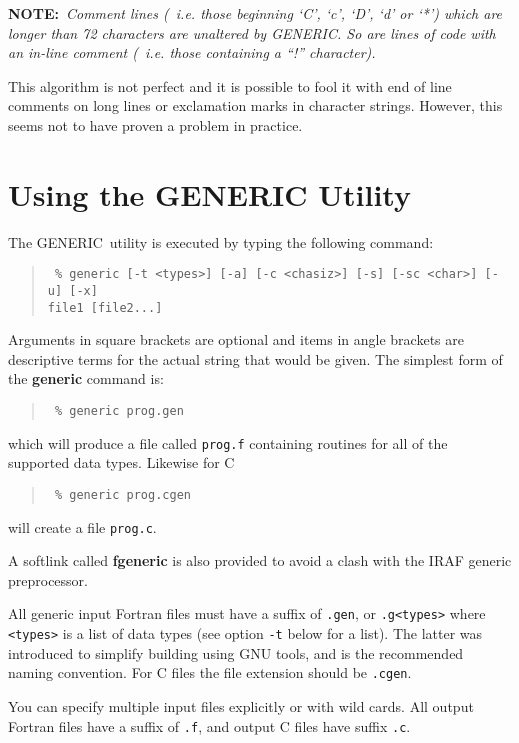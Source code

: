 \documentclass[twoside,11pt]{article}
\renewcommand{\_}{{\tt\char'137}}     %
\newcommand{\GENERIC}{{\footnotesize GENERIC}\normalsize}
\begin{document}
{\bf NOTE:}~{\it Comment lines (~{\rm i.e.} those beginning `C', `c', `D', `d' 
or `*') which are longer than 72 characters are unaltered by \GENERIC.
So are lines of code with an in-line comment (~\emph{i.e.} those containing
a ``!'' character).}

This algorithm is not perfect and it is possible to fool it with end
of line comments on long lines or exclamation marks in character
strings.  However, this seems not to have proven a problem in practice.

\section{Using the GENERIC Utility}

The \GENERIC\ utility is executed by typing the following command:

\begin{quote}{\tt
\% generic [-t <types>] [-a] [-c <chasiz>] [-s] [-sc <char>] [-u] [-x] \\
           file1 [file2...]}
\end{quote}

Arguments in square brackets are optional and items in angle brackets are
descriptive terms for the actual string that would be given.  The simplest form
of the {\bf generic} command is:

\begin{quote}{\tt
\% generic prog.gen
}
\end{quote}

which will produce a file called {\tt prog.f} containing routines for
all of the supported data types.  Likewise for C

\begin{quote}{\tt
\% generic prog.cgen
}
\end{quote}
will create a file {\tt prog.c}.

A softlink called {\bf fgeneric} is also provided to avoid a clash 
with the IRAF generic preprocessor.

All generic input Fortran files must have a suffix of {\tt .gen}, or 
{\tt .g\verb+<types>+} where \verb+<types>+ is a list of data types 
(see option {\tt -t} below for a list).  The latter was introduced to
simplify building using GNU tools, and is the recommended naming
convention.  For C files the file extension should be {\tt .cgen}.

You can specify multiple input files explicitly or with wild cards.
All output Fortran files have a suffix of {\tt .f}, and output C files
have suffix {\tt .c}.
\end{document}
